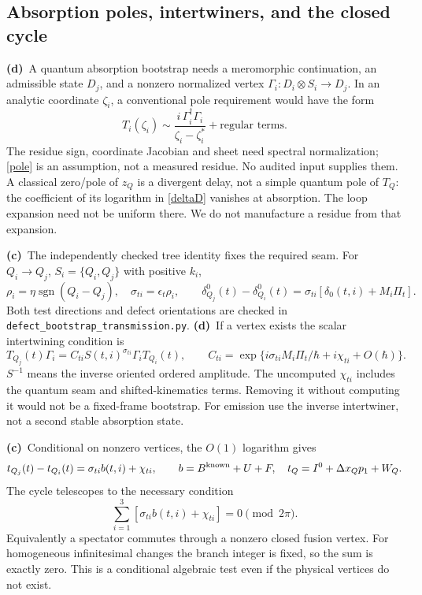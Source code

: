 \documentclass[11pt,a4paper]{article}
\newcommand{\C}{\textbf{(c)}\ }
\newcommand{\D}{\textbf{(d)}\ }
\newcommand{\file}[1]{\nolinkurl{#1}}
\newcommand{\tra}{\file{defect_bootstrap_transmission.py}}
\begin{document}
\subsection{Absorption poles, intertwiners, and the closed cycle}
\D A quantum absorption bootstrap needs a meromorphic continuation, an
admissible state $D_j$, and a nonzero normalized vertex
$\Gamma_i:D_i\otimes S_i\to D_j$. In an analytic coordinate $\zeta_i$, a
conventional pole requirement would have the form
\begin{equation}
 T_i(\zeta_i)\sim\frac{i\,\Gamma_i^\dagger\Gamma_i}
                             {\zeta_i-\zeta_i^*}+\text{regular terms}.
 \label{pole}
\end{equation}
The residue sign, coordinate Jacobian and sheet need spectral normalization;
\eqref{pole} is an assumption, not a measured residue. No audited input
supplies them. A classical zero/pole of $z_Q$ is a divergent delay, not a
simple quantum pole of $T_Q$: the coefficient of its logarithm in
\eqref{deltaD} vanishes at absorption. The loop expansion need not be uniform
there. We do not manufacture a residue from that expansion.

\C The independently checked tree identity fixes the required seam.
For $Q_i\to Q_j$, $S_i=\{Q_i,Q_j\}$ with positive $k_i$,
\begin{equation}
 \rho_i=\eta\operatorname{sgn}(Q_i-Q_j),\quad
 \sigma_{ti}=\epsilon_t\rho_i,\qquad
 \delta^0_{Q_j}(t)-\delta^0_{Q_i}(t)
     =\sigma_{ti}[\delta_0(t,i)+M_i\Pi_t].\label{seam}
\end{equation}
Both test directions and defect orientations are checked in \tra.
\D If a vertex exists the scalar intertwining condition is
\begin{equation}
 T_{Q_j}(t)\Gamma_i=C_{ti}S(t,i)^{\sigma_{ti}}\Gamma_i T_{Q_i}(t),\qquad
 C_{ti}=\exp\{i\sigma_{ti}M_i\Pi_t/\hbar+i\chi_{ti}+O(\hbar)\}.
 \label{intertwine}
\end{equation}
$S^{-1}$ means the inverse oriented ordered amplitude. The uncomputed
$\chi_{ti}$ includes the quantum seam and shifted-kinematics terms.
Removing it without computing it would not be a fixed-frame bootstrap.
For emission use the inverse intertwiner, not a second stable absorption state.

\C Conditional on nonzero vertices, the $O(1)$ logarithm gives
\begin{equation}
 t_{Q_j}(t)-t_{Q_i}(t)=\sigma_{ti}b(t,i)+\chi_{ti},\qquad
 b=B^{\rm known}+U+F,\quad t_Q=I^0+\Delta x_Qp_1+W_Q.\label{edgeeq}
\end{equation}
The cycle telescopes to the necessary condition
\begin{equation}
 \sum_{i=1}^3[\sigma_{ti}b(t,i)+\chi_{ti}]=0\pmod{2\pi}.\label{cycle}
\end{equation}
Equivalently a spectator commutes through a nonzero closed fusion vertex.
For homogeneous infinitesimal changes the branch integer is fixed, so the
sum is exactly zero. This is a conditional algebraic test even if the
physical vertices do not exist.
\end{document}
